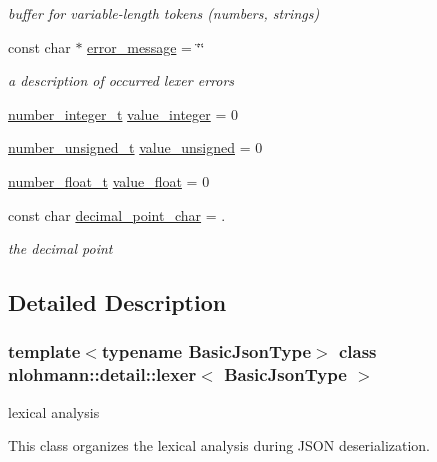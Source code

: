 \begin{DoxyCompactItemize}
\begin{DoxyCompactList}\small\item\em buffer for variable-\/length tokens (numbers, strings) \end{DoxyCompactList}\item 
const char $\ast$ \mbox{\hyperlink{classnlohmann_1_1detail_1_1lexer_ae2a15e440f1889e0ab0c6a35344e48df}{error\+\_\+message}} = \char`\"{}\char`\"{}
\begin{DoxyCompactList}\small\item\em a description of occurred lexer errors \end{DoxyCompactList}\item 
\mbox{\hyperlink{classnlohmann_1_1detail_1_1lexer_a9cd1b11cc67edbfb2613c788b5bd337c}{number\+\_\+integer\+\_\+t}} \mbox{\hyperlink{classnlohmann_1_1detail_1_1lexer_a353d8eeca5b2f21b3e88540c17afb9bc}{value\+\_\+integer}} = 0
\item 
\mbox{\hyperlink{classnlohmann_1_1detail_1_1lexer_a105d1dfeab414a572655895cdd96a52a}{number\+\_\+unsigned\+\_\+t}} \mbox{\hyperlink{classnlohmann_1_1detail_1_1lexer_af250180459c23ca71c3e10a99fb5ba3e}{value\+\_\+unsigned}} = 0
\item 
\mbox{\hyperlink{classnlohmann_1_1detail_1_1lexer_aa7f9e7b2bcd311fb86e2da43761a6619}{number\+\_\+float\+\_\+t}} \mbox{\hyperlink{classnlohmann_1_1detail_1_1lexer_a861ce804da2d257ee373d1e0b55780e1}{value\+\_\+float}} = 0
\item 
const char \mbox{\hyperlink{classnlohmann_1_1detail_1_1lexer_a16593b0475f6d1cddd5eaf7c045771f3}{decimal\+\_\+point\+\_\+char}} = \textquotesingle{}.\textquotesingle{}
\begin{DoxyCompactList}\small\item\em the decimal point \end{DoxyCompactList}\end{DoxyCompactItemize}


\subsection{Detailed Description}
\subsubsection*{template$<$typename Basic\+Json\+Type$>$\newline
class nlohmann\+::detail\+::lexer$<$ Basic\+Json\+Type $>$}

lexical analysis 

This class organizes the lexical analysis during J\+S\+ON deserialization. 

